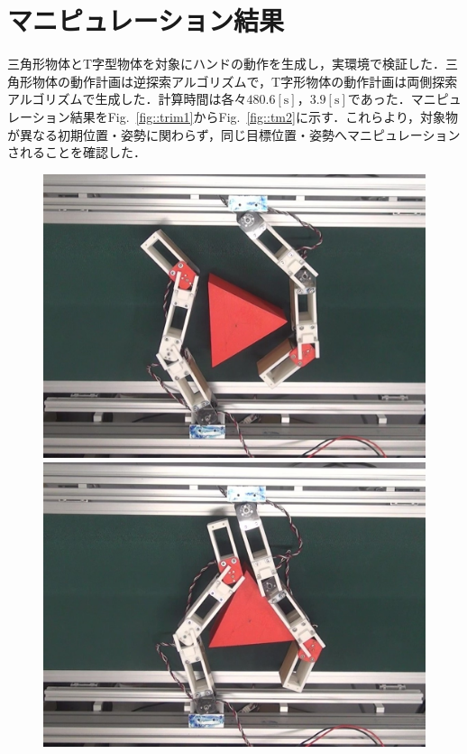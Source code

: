 \documentclass[a4paper,papersize,dvipdfmx]{mtabst}
\newcommand{\figref}[1]{Fig.~\ref{#1}}
\begin{document}
\section{マニピュレーション結果}
三角形物体とT字型物体を対象にハンドの動作を生成し，実環境で検証した．三角形物体の動作計画は逆探索アルゴリズムで，T字形物体の動作計画は両側探索アルゴリズムで生成した．計算時間は各々$480.6 \mathrm{[s]}$，$3.9 \mathrm{[s]}$であった．マニピュレーション結果を\figref{fig::trim1}から\figref{fig::tm2}に示す．これらより，対象物が異なる初期位置・姿勢に関わらず，同じ目標位置・姿勢へマニピュレーションされることを確認した．
\begin{figure}[t]
\centering
\begin{minipage}{0.249\linewidth}
\centering
\includegraphics[width=0.9\linewidth]{fig/4-manipulation-result/Triangle/1-1.jpg}
\end{minipage}\hfill
\begin{minipage}{0.249\linewidth}
\centering
\includegraphics[width=0.9\linewidth]{fig/4-manipulation-result/Triangle/1-2.jpg}

\end{minipage}
\end{figure}
\end{document}
